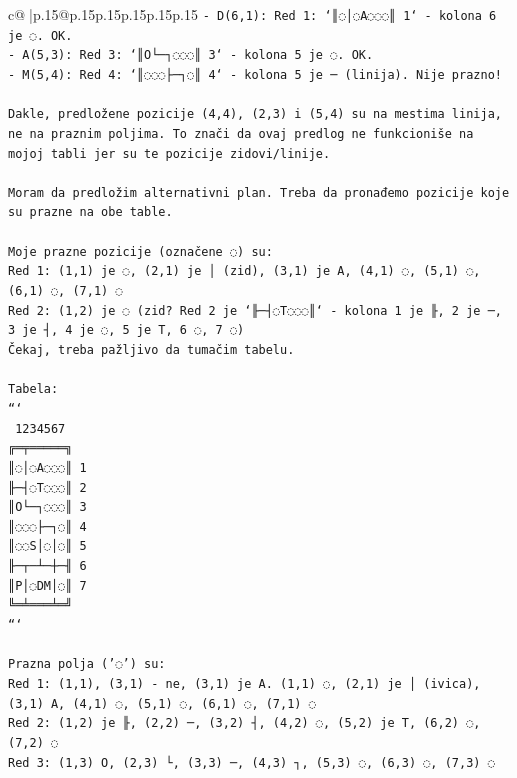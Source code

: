 \documentclass{article}
\begin{document}
{\begin{supertabular}{c@{$\;$}|p{.15\linewidth}@{}p{.15\linewidth}p{.15\linewidth}p{.15\linewidth}p{.15\linewidth}p{.15\linewidth}}
{{{\texttt{{-} D(6,1): Red 1: `║◌│◌A◌◌◌║ 1` {-} kolona 6 je ◌. OK.} \\
\texttt{{-} A(5,3): Red 3: `║O└─┐◌◌◌║ 3` {-} kolona 5 je ◌. OK.} \\
\texttt{{-} M(5,4): Red 4: `║◌◌◌├─┐◌║ 4` {-} kolona 5 je ─ (linija). Nije prazno!} \\
\\ 
\texttt{Dakle, predložene pozicije (4,4), (2,3) i (5,4) su na mestima linija, ne na praznim poljima. To znači da ovaj predlog ne funkcioniše na mojoj tabli jer su te pozicije zidovi/linije.} \\
\\ 
\texttt{Moram da predložim alternativni plan. Treba da pronađemo pozicije koje su prazne na obe table.} \\
\\ 
\texttt{Moje prazne pozicije (označene ◌) su:} \\
\texttt{Red 1: (1,1) je ◌, (2,1) je │ (zid), (3,1) je A, (4,1) ◌, (5,1) ◌, (6,1) ◌, (7,1) ◌} \\
\texttt{Red 2: (1,2) je ◌ (zid? Red 2 je `╟─┤◌T◌◌◌║` {-} kolona 1 je ╟, 2 je ─, 3 je ┤, 4 je ◌, 5 je T, 6 ◌, 7 ◌)} \\
\texttt{Čekaj, treba pažljivo da tumačim tabelu.} \\
\\ 
\texttt{Tabela:} \\
\texttt{```} \\
\texttt{ 1234567} \\
\texttt{╔═╤═════╗} \\
\texttt{║◌│◌A◌◌◌║ 1} \\
\texttt{╟─┤◌T◌◌◌║ 2} \\
\texttt{║O└─┐◌◌◌║ 3} \\
\texttt{║◌◌◌├─┐◌║ 4} \\
\texttt{║◌◌S│◌│◌║ 5} \\
\texttt{╟─┬─┴─┼─╢ 6} \\
\texttt{║P│◌DM│◌║ 7} \\
\texttt{╚═╧═══╧═╝} \\
\texttt{```} \\
\\ 
\texttt{Prazna polja ('◌') su:} \\
\texttt{Red 1: (1,1), (3,1) {-} ne, (3,1) je A. (1,1) ◌, (2,1) je │ (ivica), (3,1) A, (4,1) ◌, (5,1) ◌, (6,1) ◌, (7,1) ◌} \\
\texttt{Red 2: (1,2) je ╟, (2,2) ─, (3,2) ┤, (4,2) ◌, (5,2) je T, (6,2) ◌, (7,2) ◌} \\
\texttt{Red 3: (1,3) O, (2,3) └, (3,3) ─, (4,3) ┐, (5,3) ◌, (6,3) ◌, (7,3) ◌} \\
}}}
\end{supertabular}}
\end{document}
